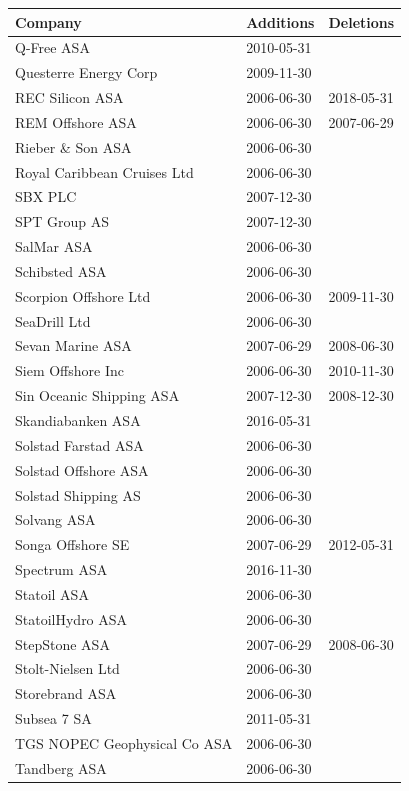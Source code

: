 \begin{table}[H]
\centering
\begin{tabularx}{\textwidth}{XXX}
\toprule
Company & Additions & Deletions \\ 
\midrule
Q-Free ASA & 2010-05-31 &  \\ 
Questerre Energy Corp & 2009-11-30 &  \\ 
REC Silicon ASA & 2006-06-30 & 2018-05-31 \\ 
REM Offshore ASA & 2006-06-30 & 2007-06-29 \\ 
Rieber \& Son ASA & 2006-06-30 &  \\ 
Royal Caribbean Cruises Ltd & 2006-06-30 &  \\ 
SBX PLC & 2007-12-30 &  \\ 
SPT Group AS & 2007-12-30 &  \\ 
SalMar ASA & 2006-06-30 &  \\ 
Schibsted ASA & 2006-06-30 &  \\ 
Scorpion Offshore Ltd & 2006-06-30 & 2009-11-30 \\ 
SeaDrill Ltd & 2006-06-30 &  \\ 
Sevan Marine ASA & 2007-06-29 & 2008-06-30 \\ 
Siem Offshore Inc & 2006-06-30 & 2010-11-30 \\ 
Sin Oceanic Shipping ASA & 2007-12-30 & 2008-12-30 \\ 
Skandiabanken ASA & 2016-05-31 &  \\ 
Solstad Farstad ASA & 2006-06-30 &  \\ 
Solstad Offshore ASA & 2006-06-30 &  \\ 
Solstad Shipping AS & 2006-06-30 &  \\ 
Solvang ASA & 2006-06-30 &  \\ 
Songa Offshore SE & 2007-06-29 & 2012-05-31 \\ 
Spectrum ASA & 2016-11-30 &  \\ 
Statoil ASA & 2006-06-30 &  \\ 
StatoilHydro ASA & 2006-06-30 &  \\ 
StepStone ASA & 2007-06-29 & 2008-06-30 \\ 
Stolt-Nielsen Ltd & 2006-06-30 &  \\ 
Storebrand ASA & 2006-06-30 &  \\ 
Subsea 7 SA & 2011-05-31 &  \\ 
TGS NOPEC Geophysical Co ASA & 2006-06-30 &  \\ 
Tandberg ASA & 2006-06-30 &  \\ 

\end{tabularx}
\end{table}
